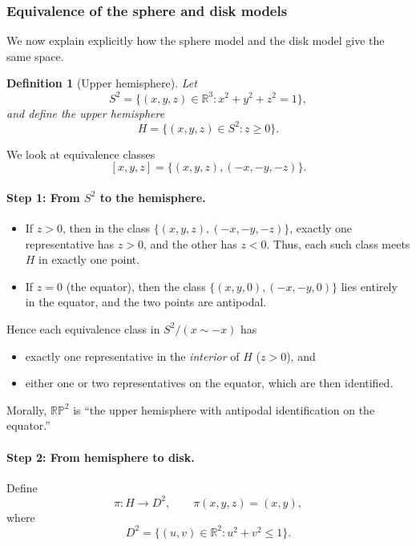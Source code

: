 \documentclass[12pt,a4paper]{article}
\theoremstyle{plain}
\newtheorem{definition}{Definition}
\theoremstyle{definition}      %
\begin{document}
	\subsubsection{Equivalence of the sphere and disk models}
	
	We now explain explicitly how the sphere model and the disk model give the
	same space.
	
	\begin{definition}[Upper hemisphere]
		Let
		\[
		S^2 = \{(x,y,z)\in\mathbb{R}^3 : x^2 + y^2 + z^2 = 1\},
		\]
		and define the upper hemisphere
		\[
		H = \{(x,y,z)\in S^2 : z \ge 0\}.
		\]
	\end{definition}
	
	We look at equivalence classes
	\[
	[x,y,z] = \{(x,y,z),(-x,-y,-z)\}.
	\]
	
	\paragraph{Step 1: From $S^2$ to the hemisphere.}
	\begin{itemize}
		\item If $z>0$, then in the class $\{(x,y,z),(-x,-y,-z)\}$, exactly one
		representative has $z>0$, and the other has $z<0$.
		Thus, each such class meets $H$ in exactly one point.
		\item If $z=0$ (the equator), then the class
		$\{(x,y,0),(-x,-y,0)\}$ lies entirely in the equator, and the two points are antipodal.
	\end{itemize}
	
	Hence each equivalence class in $S^2/(x\sim -x)$ has
	\begin{itemize}
		\item exactly one representative in the \emph{interior} of $H$ ($z>0$), and
		\item either one or two representatives on the equator, which are then identified.
	\end{itemize}
	
	Morally, $\mathbb{RP}^2$ is ``the upper hemisphere with antipodal identification on the equator.''
	
	\paragraph{Step 2: From hemisphere to disk.}
	
	Define
	\[
	\pi : H \longrightarrow D^2, 
	\qquad
	\pi(x,y,z) = (x,y),
	\]
	where
	\[
	D^2 = \{(u,v)\in\mathbb{R}^2 : u^2 + v^2 \le 1\}.
	\]
	
\end{document}
